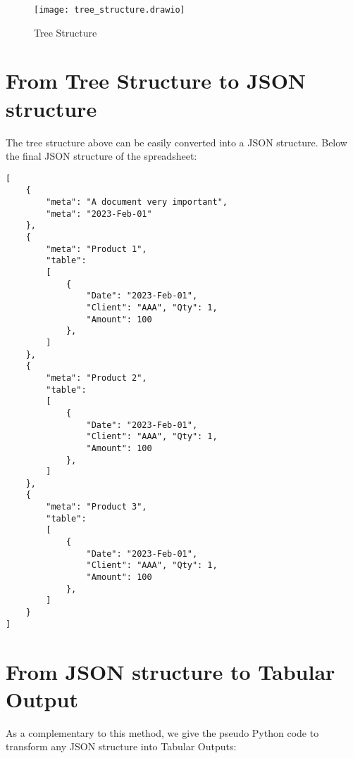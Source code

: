 \documentclass{article}
\begin{document}
\begin{figure}[H]
\caption{Tree Structure}
\texttt{[image: tree\_structure.drawio]}
\end{figure}

\section{From Tree Structure to JSON structure}
The tree structure above can be easily converted into a JSON structure. Below the final JSON structure of the
spreadsheet:

\begin{lstlisting}[caption=JSON Structure]
[
    {
		"meta": "A document very important",
		"meta": "2023-Feb-01"
    },
    {
		"meta": "Product 1",
		"table": 
		[
            {
                "Date": "2023-Feb-01", 
                "Client": "AAA", "Qty": 1,
                "Amount": 100
            },
        ]
    },
    {
		"meta": "Product 2",
		"table": 
		[
			{
                "Date": "2023-Feb-01",
                "Client": "AAA", "Qty": 1,
                "Amount": 100
            },
        ]
    },
    {
		"meta": "Product 3",
		"table": 
		[
			{
                "Date": "2023-Feb-01",
                "Client": "AAA", "Qty": 1,
                "Amount": 100
            },
        ]
    }
]
\end{lstlisting}

\section{From JSON structure to Tabular Output}
As a complementary to this method, we give the pseudo Python code to transform any JSON structure into Tabular Outputs:
\end{document}
